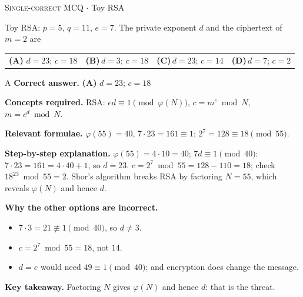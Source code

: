 \documentclass[11pt,a4paper]{article}
\newcommand{\optlabel}[1]{\textbf{(#1)}}
\newcommand{\correctlabel}[1]{\textcolor{okgreen}{\textbf{(#1)}\,\ding{51}}}
\newenvironment{qitem}[1]{\begin{list}{}{\setlength{\leftmargin}{3.3em}\setlength{\labelwidth}{3.1em}%
  \setlength{\labelsep}{0.2em}\setlength{\topsep}{3pt}\setlength{\parsep}{3pt}}\item[\textbf{Q.#1}\hfill]}{\end{list}}
\newcommand{\qsep}{\par\vspace{2pt}{\color{black!15}\hrule}\vspace{4pt}}
\newcommand{\qmeta}[2]{{\footnotesize\color{black!60}\textsc{#1} \;$\cdot$\; #2}\par}
\begin{document}
\begin{qitem}{72}
\qmeta{Single-correct MCQ}{Toy RSA}
Toy RSA: $p = 5$, $q = 11$, $e = 7$. The private exponent $d$ and the ciphertext of $m = 2$ are
\par\smallskip\noindent\begin{tabularx}{\linewidth}{@{}*{4}{L}@{}}
\correctlabel{A}\,$d = 23$; $c = 18$ & \optlabel{B}\,$d = 3$; $c = 18$ & \optlabel{C}\,$d = 23$; $c = 14$ & \optlabel{D}\,$d = 7$; $c = 2$
\end{tabularx}
\end{qitem}
\begin{solbox}{A}
\textbf{\color{brand}Correct answer.} \textcolor{okgreen}{\textbf{(A)}} $d = 23$; $c = 18$

\textbf{\color{brand}Concepts required.} RSA: $ed \equiv 1 \pmod{\varphi(N)}$, $c = m^e \bmod N$, $m = c^d \bmod N$.

\textbf{\color{brand}Relevant formulae.} $\varphi(55) = 40$, $7\cdot23 = 161 \equiv 1$; $2^7 = 128 \equiv 18 \pmod{55}$.

\textbf{\color{brand}Step-by-step explanation.} $\varphi(55) = 4\cdot10 = 40$; $7d \equiv 1 \pmod{40}$: $7\cdot23 = 161 = 4\cdot40 + 1$, so $d = 23$. $c = 2^7 \bmod 55 = 128 - 110 = 18$; check $18^{23} \bmod 55 = 2$. Shor's
algorithm breaks RSA by factoring $N = 55$, which reveals $\varphi(N)$ and hence $d$.

\textbf{\color{brand}Why the other options are incorrect.}
\begin{itemize}[leftmargin=2.4em, itemsep=1pt, topsep=2pt]
\item[\textbf{(B)}] $7\cdot3 = 21 \not\equiv 1 \pmod{40}$, so $d \ne 3$.
\item[\textbf{(C)}] $c = 2^7 \bmod 55 = 18$, not $14$.
\item[\textbf{(D)}] $d = e$ would need $49 \equiv 1 \pmod{40}$; and encryption does change the message.
\end{itemize}
\textbf{\color{brand}Key takeaway.} Factoring $N$ gives $\varphi(N)$ and hence $d$: that is the threat.
\end{solbox}
\qsep
\end{document}
